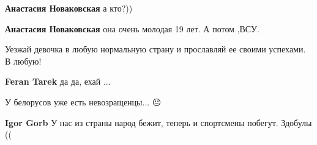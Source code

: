 \begin{itemize}
\begin{itemize}
\textbf{Анастасия Новаковская} а кто?))

 
\textbf{Анастасия Новаковская} она очень молодая 19 лет.
А потом ,ВСУ.
\end{itemize}

 
Уезжай девочка в любую нормальную страну и прославляй ее своими успехами. В любую!

\begin{itemize}
 
\textbf{Feran Tarek} да да, ехай ...
\end{itemize}

 
У белорусов уже есть невозращенцы... 😐

\begin{itemize}
 
\textbf{Igor Gorb} У нас из страны народ бежит, теперь и спортсмены побегут. Здобулы ((

 

\end{itemize}
\end{itemize}
